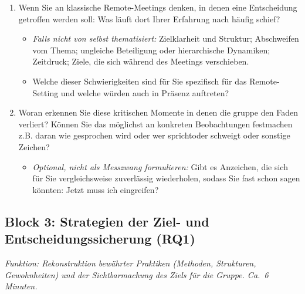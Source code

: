 \begin{enumerate}[label=2.\arabic*, leftmargin=*]
  \item Wenn Sie an klassische Remote-Meetings denken, in denen eine Entscheidung getroffen
    werden soll: Was läuft dort Ihrer Erfahrung nach häufig schief?
    \begin{itemize}[label=\textendash]
      \item \textit{Falls nicht von selbst thematisiert:} Zielklarheit und Struktur;
        Abschweifen vom Thema; ungleiche Beteiligung oder hierarchische Dynamiken;
        Zeitdruck; Ziele, die sich während des Meetings verschieben.
      \item Welche dieser Schwierigkeiten sind für Sie spezifisch für das Remote-Setting und welche würden auch
        in Präsenz auftreten?
    \end{itemize}
  \item Woran erkennen Sie diese kritischen Momente in denen die gruppe den Faden verliert? Können Sie das
    möglichst an konkreten Beobachtungen festmachen z.B. daran wie gesprochen wird oder wer sprichtoder
    schweigt oder sonstige Zeichen?
    \begin{itemize}[label=\textendash]
      \item \textit{Optional, nicht als Messzwang formulieren:} Gibt es Anzeichen, die
        sich für Sie vergleichsweise zuverlässig wiederholen, sodass Sie fast schon
        sagen könnten: Jetzt muss ich eingreifen?
    \end{itemize}

\end{enumerate}

\subsection*{Block 3: Strategien der Ziel- und Entscheidungssicherung (RQ1)}
\textit{Funktion: Rekonstruktion bewährter Praktiken (Methoden, Strukturen, Gewohnheiten)
und der Sichtbarmachung des Ziels für die Gruppe. Ca.\ 6 Minuten.}

